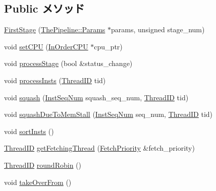 \subsection*{Public メソッド}
\begin{DoxyCompactItemize}
\item 
\hyperlink{classFirstStage_a11c6e3fc6cdc379408dffb110f0fb5e6}{FirstStage} (\hyperlink{namespaceThePipeline_ab62ca16eeca26566ad2422b5df4943ce}{ThePipeline::Params} $\ast$params, unsigned stage\_\-num)
\item 
void \hyperlink{classFirstStage_a6fd0f914e19bcfb6d9f28e537ad956d5}{setCPU} (\hyperlink{classInOrderCPU}{InOrderCPU} $\ast$cpu\_\-ptr)
\item 
void \hyperlink{classFirstStage_a0782fca2c80ef367ee914d464584ab20}{processStage} (bool \&status\_\-change)
\item 
void \hyperlink{classFirstStage_a4120d7c6b83eb82877f4d21109c105ba}{processInsts} (\hyperlink{base_2types_8hh_ab39b1a4f9dad884694c7a74ed69e6a6b}{ThreadID} tid)
\item 
void \hyperlink{classFirstStage_ad9e3c0e17499440cfafb6145d7be97a1}{squash} (\hyperlink{inst__seq_8hh_a258d93d98edaedee089435c19ea2ea2e}{InstSeqNum} squash\_\-seq\_\-num, \hyperlink{base_2types_8hh_ab39b1a4f9dad884694c7a74ed69e6a6b}{ThreadID} tid)
\item 
void \hyperlink{classFirstStage_a960b60a46045a5363df0c263f0f43902}{squashDueToMemStall} (\hyperlink{inst__seq_8hh_a258d93d98edaedee089435c19ea2ea2e}{InstSeqNum} seq\_\-num, \hyperlink{base_2types_8hh_ab39b1a4f9dad884694c7a74ed69e6a6b}{ThreadID} tid)
\item 
void \hyperlink{classFirstStage_a9ff2aa32ab0f40674cb3518108d62f8e}{sortInsts} ()
\item 
\hyperlink{base_2types_8hh_ab39b1a4f9dad884694c7a74ed69e6a6b}{ThreadID} \hyperlink{classFirstStage_a4a20466270bc79a695af63ea67a35576}{getFetchingThread} (\hyperlink{classFirstStage_a818d5f50fdcec74a1a445b4fa8b760e3}{FetchPriority} \&fetch\_\-priority)
\item 
\hyperlink{base_2types_8hh_ab39b1a4f9dad884694c7a74ed69e6a6b}{ThreadID} \hyperlink{classFirstStage_a8aab9cacbc483081596b13ecd5192eb5}{roundRobin} ()
\item 
void \hyperlink{classFirstStage_a8674059ce345e23aac5086b2c3e24a43}{takeOverFrom} ()
\end{DoxyCompactItemize}
